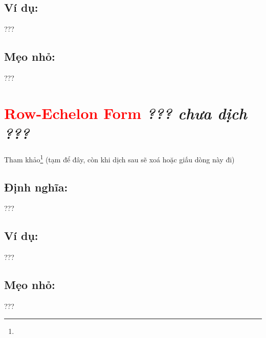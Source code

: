 \subsection*{Ví dụ:}
???
\subsection*{Mẹo nhỏ:}
???
\section*{\huge \textcolor{Red}{Row-Echelon Form}  \small \textit{??? chưa dịch ???} }
Tham khảo\footnote{} (tạm để đây, còn khi dịch sau sẽ xoá hoặc giấu dòng này đi)
\subsection*{Định nghĩa:}
???
\subsection*{Ví dụ:}
???
\subsection*{Mẹo nhỏ:}
???
